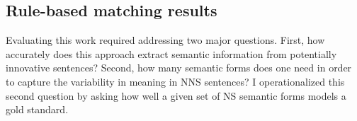 %
%
%

\subsection{Rule-based matching results}
\label{sec:rule-results}

Evaluating this work required addressing two major questions.  First,
how accurately does this approach extract semantic information from potentially
innovative sentences?
Second, how many semantic forms does one need in order to capture the variability in meaning in NNS sentences? I operationalized this second question by asking how well a given set of NS semantic forms models a gold standard.

